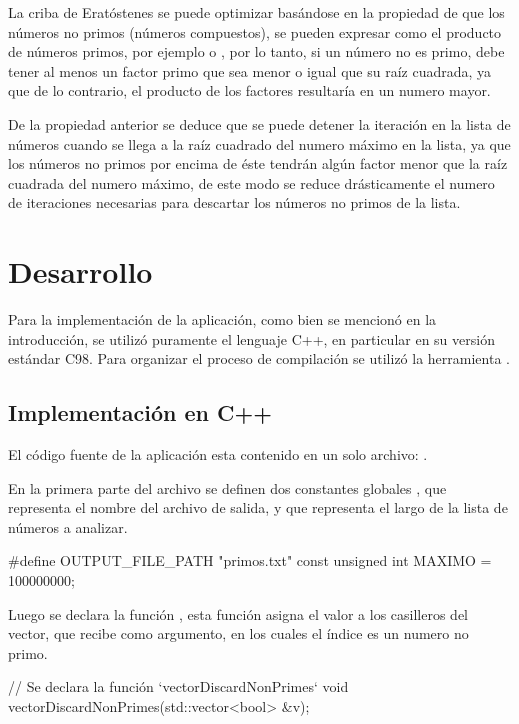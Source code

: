 \documentclass[12pt]{article}
\newenvironment{fullgrayverb}
{\verbbox}
{\endverbbox\par\colorbox{gray!25}{\parbox{\textwidth}{\theverbbox}}\par}
\begin{document}
La criba de Eratóstenes se puede optimizar basándose en la propiedad de que los
números no primos (números compuestos), se pueden expresar como el producto de
números primos, por ejemplo  o , por lo tanto, si
un número no es primo, debe tener al menos un factor primo que sea menor o igual
que su raíz cuadrada, ya que de lo contrario, el producto de los factores
resultaría en un numero mayor.

De la propiedad anterior se deduce que se puede detener la iteración en la lista
de números cuando se llega a la raíz cuadrado del numero máximo en la lista, ya
que los números no primos por encima de éste tendrán algún factor menor que la
raíz cuadrada del numero máximo, de este modo se reduce drásticamente el numero
de iteraciones necesarias para descartar los números no primos de la lista.

\section{Desarrollo}

Para la implementación de la aplicación, como bien se mencionó en la
introducción, se utilizó puramente el lenguaje C++, en particular en su versión
estándar C98. Para organizar el proceso de compilación se utilizó la herramienta
.

\subsection{Implementación en C++}

El código fuente de la aplicación esta contenido en un solo archivo:
.

En la primera parte del archivo se definen dos constantes globales
, que representa el nombre del archivo de salida, y
 que representa el largo de la lista de números a analizar.

\begin{fullgrayverb}[\mbox{}]
#define OUTPUT_FILE_PATH "primos.txt"
const unsigned int MAXIMO = 100000000;
\end{fullgrayverb}

Luego se declara la función , esta función asigna
el valor  a los casilleros del vector, que recibe como argumento, en
los cuales el índice es un numero no primo.

\begin{fullgrayverb}[\mbox{}]
// Se declara la función `vectorDiscardNonPrimes`
void vectorDiscardNonPrimes(std::vector<bool> &v);
\end{fullgrayverb}
\end{document}
